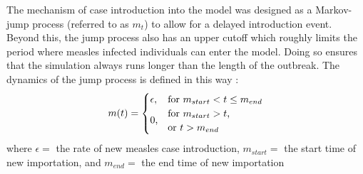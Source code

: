 \documentclass[../Paper.tex]{subfiles}
\begin{document}
The mechanism of case introduction into the model was designed as a Markov-jump
process (referred to as $m_{t}$) to allow for a delayed introduction event.
Beyond this, the jump process also has an upper cutoff which roughly limits the
period where measles infected individuals can enter the model. Doing so ensures
that the simulation always runs longer than the length of the outbreak.
The dynamics of the jump process is defined in this way :
\begin{equation}
m(t) = \begin{cases}
        \epsilon , & \mbox{for } m_{start} < t \leq m_{end} \\
        \multirow{2}{*}{0,} & \text{for } m_{start} > t \text{,} \\
                            & \text{or } t > m_{end}\\
       \end{cases}
\end{equation}
where $\epsilon =$ the rate of new measles case introduction,
$m_{start} =$ the start time of new importation, and
$m_{end} =$ the end time of new importation
\clearpage
\end{document}
